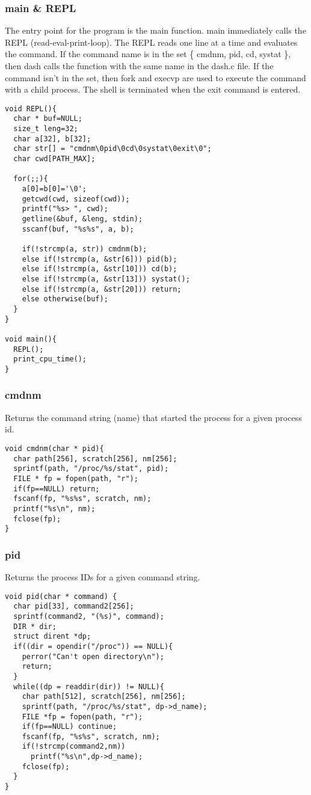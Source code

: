 \documentclass[12pt]{article}
\begin{document}
\noindent \subsubsection*{main \& REPL} \par
The entry point for the program is the {\ttfamily main} function. {\ttfamily main} immediately calls the REPL (read-eval-print-loop). The REPL reads one line at a time and evaluates the command. If the command name is in the set \{ {\ttfamily cmdnm}, {\ttfamily pid}, {\ttfamily cd}, {\ttfamily systat} \}, then dash calls the function with the same name in the dash.c file. If the command isn't in the set, then {\ttfamily fork} and {\ttfamily execvp} are used to execute the command with a child process. The shell is terminated when the {\ttfamily exit} command is entered.
\begin{verbatim}
void REPL(){
  char * buf=NULL;
  size_t leng=32;
  char a[32], b[32];
  char str[] = "cmdnm\0pid\0cd\0systat\0exit\0";
  char cwd[PATH_MAX];

  for(;;){
    a[0]=b[0]='\0';
    getcwd(cwd, sizeof(cwd));  
    printf("%s> ", cwd);
    getline(&buf, &leng, stdin);
    sscanf(buf, "%s%s", a, b);

    if(!strcmp(a, str)) cmdnm(b);	
    else if(!strcmp(a, &str[6])) pid(b);
    else if(!strcmp(a, &str[10])) cd(b);
    else if(!strcmp(a, &str[13])) systat();
    else if(!strcmp(a, &str[20])) return;
    else otherwise(buf); 
  }
}

void main(){ 
  REPL(); 
  print_cpu_time();
}
\end{verbatim}

\noindent \subsubsection*{cmdnm} \par
Returns the command string (name) that started the process for a given process id.
\begin{verbatim}
void cmdnm(char * pid){
  char path[256], scratch[256], nm[256];
  sprintf(path, "/proc/%s/stat", pid);
  FILE * fp = fopen(path, "r");	
  if(fp==NULL) return;
  fscanf(fp, "%s%s", scratch, nm);
  printf("%s\n", nm);
  fclose(fp);
}
\end{verbatim}

\noindent \subsubsection*{pid} \par
Returns the process IDs for a given command string.
\begin{verbatim}
void pid(char * command) {
  char pid[33], command2[256];
  sprintf(command2, "(%s)", command);
  DIR * dir;
  struct dirent *dp;
  if((dir = opendir("/proc")) == NULL){
    perror("Can't open directory\n");
    return;
  }
  while((dp = readdir(dir)) != NULL){
    char path[512], scratch[256], nm[256];
    sprintf(path, "/proc/%s/stat", dp->d_name);
    FILE *fp = fopen(path, "r");	
    if(fp==NULL) continue;
    fscanf(fp, "%s%s", scratch, nm);
    if(!strcmp(command2,nm))
      printf("%s\n",dp->d_name);
    fclose(fp);
  }
}
\end{verbatim}
\end{document}
